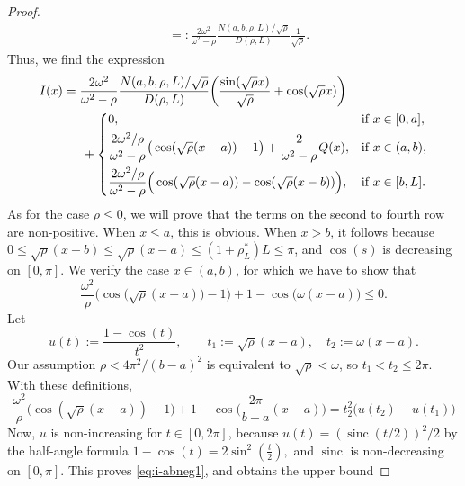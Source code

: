 \documentclass[a4paper, a4wide, 10pt, reqno]{amsart}
\theoremstyle{plain}
\theoremstyle{definition}
\numberwithin{equation}{section}
\begin{document}
\begin{proof}
\begin{equation}
\begin{aligned}
        &=:\frac{2\omega^2}{\omega^2-\rho}\frac{ N(a, b, \rho, L)/\sqrt{\rho}}{D(\rho, L)}\frac{1}{\sqrt{\rho}}.
        \end{aligned}
        \end{equation}
        Thus, we find the expression
        \begin{equation}\label{eq:I-expression}
        \begin{aligned}
        I(x) &= \frac{2\omega^2}{\omega^2-\rho}\frac{N(a,b,\rho, L)/\sqrt{\rho}}{ D(\rho, L)}\bigg(\frac{\sin(\sqrt{\rho}x)}{\sqrt\rho} + \cos(\sqrt{\rho}x)\bigg)\\&\hspace{15pt}+ \begin{dcases}
            0,&\text{if }x\in[0, a],\\
            \frac{2\omega^2/\rho}{\omega^2-\rho}\big(\cos(\sqrt{\rho}(x-a))-1\big) +\frac{2}{\omega^2-\rho}Q(x),&\text{if }x\in(a,b),\\
            \frac{2\omega^2/\rho}{\omega^2-\rho}\Big(\cos(\sqrt{\rho}(x-a))-\cos(\sqrt{\rho}(x-b))\Big),&\text{if }x\in[b, L].
        \end{dcases}
        \end{aligned}
        \end{equation}
        As for the case $\rho\le 0$, we will prove that the terms on the second to fourth row are non-positive. When $x\le a$, this is obvious. When $x>b$, it follows because  $0\le \sqrt{\rho}(x-b)\le \sqrt{\rho}(x-a)\le (1+\rho^*_L) L\le\pi$, and $\cos(s)$ is decreasing on $[0, \pi]$. We verify the case $x\in(a,b)$, for which we have to show that 
       \begin{equation}\label{eq:i-abneg1}
       \frac{\omega^2}{\rho}\Big(\cos\big(\sqrt{\rho}(x-a)\big)-1\Big) + 1-\cos\big(\omega(x-a)\big) \le 0.
       \end{equation}
       Let 
        \[
        u(t) := \frac{1-\cos(t)}{t^2}, \qquad t_1:=\sqrt{\rho}(x-a), \quad t_2:=\omega(x-a).
        \]
        Our assumption $\rho<4\pi^2/(b-a)^2$ is equivalent to $\sqrt{\rho}<\omega$, so $t_1<t_2\le 2\pi$. With these definitions, 
        \[
        \frac{\omega^2}{\rho}\Big(\cos(\sqrt{\rho}(x-a))-1\Big) + 1-\cos\Big(\frac{2\pi}{b-a}(x-a)\Big) = t_2^2\Big(u(t_2)-u(t_1)\Big) 
        \]
        Now, $u$ is non-increasing for $t\in[0, 2\pi]$, because $u(t) = (\operatorname{sinc}(t/2))^2/2$ by the half-angle formula 
        \(
        1-\cos(t)=2\sin^2(\tfrac{t}{2}),
        \)
        and $\operatorname{sinc}$ is non-decreasing on $[0,\pi]$.
        This proves \eqref{eq:i-abneg1}, and obtains the upper bound 

\end{proof}
\end{document}

